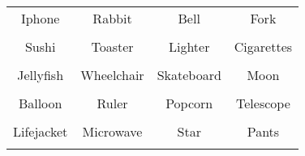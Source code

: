 \documentclass[12pt,a4paper]{article}
\begin{document}
\thispagestyle{empty}
\begin{table}[]
\centering
\Huge
\begin{tabular}{cccc}
 Iphone& Rabbit& Bell& Fork\\  & & & \\
 Sushi& Toaster& Lighter& Cigarettes\\  & & & \\
 Jellyfish& Wheelchair& Skateboard& Moon\\  & & & \\
 Balloon& Ruler& Popcorn& Telescope\\  & & & \\
 Lifejacket& Microwave& Star& Pants\\  & & & \\
\end{tabular}
\end{table}
\end{document}
